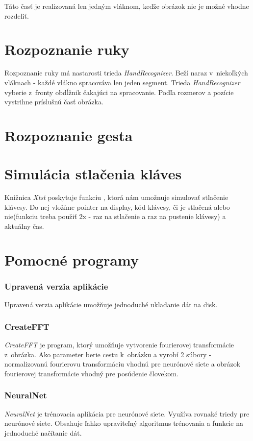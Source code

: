 Táto časť je realizovaná len jedným vláknom, keďže obrázok nie je možné vhodne rozdeliť.

\section{Rozpoznanie ruky}

Rozpoznanie ruky má nastarosti trieda \textit{HandRecognizer}. Beží naraz v~niekoľkých vláknach - každé vlákno spracováva len jeden segment.
Trieda \textit{HandRecognizer} vyberie z~fronty obdĺžnik čakajúci na spracovanie. Podľa rozmerov a pozície vystrihne príslušnú časť obrázka.
\todo

\section{Rozpoznanie gesta}
\todo

\section{Simulácia stlačenia kláves}
Knižnica \textit{Xtst} poskytuje funkciu , ktorá nám umožnuje simulovať stlačenie klávesy. Do nej vložíme pointer na display, kód klávesy, či je stlačená alebo nie(funkciu treba použiť 2x - raz na stlačenie a raz na pustenie klávesy) a aktuálny čas.

\section{Pomocné programy}

\subsubsection{Upravená verzia aplikácie}
Upravená verzia aplikácie umožňuje jednoduché ukladanie dát na disk.
\todo

\subsubsection{CreateFFT}

\textit{CreateFFT} je program, ktorý umožňuje vytvorenie fourierovej transformácie z~obrázka. Ako parameter berie cestu k~obrázku a vyrobí 2 súbory - normalizovanú fourierovu transformáciu vhodnú pre neurónové siete a obrázok fourierovej transformácie vhodný pre posúdenie človekom.

\subsubsection{NeuralNet}\label{chap:neuralnetapp}
\textit{NeuralNet} je trénovacia aplikácia pre neurónové siete. Využíva rovnaké triedy pre neurónové siete. Obsahuje ľahko upraviteľný algoritmus trénovania a funkcie na jednoduché načítanie dát. 

